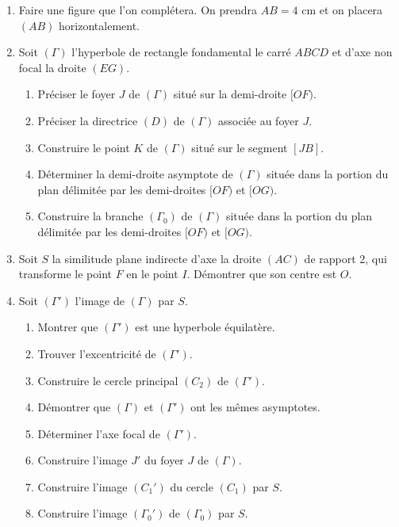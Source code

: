 \documentclass[11pt]{article}
\begin{document}
\begin{enumerate}
  \item Faire une figure que l'on complétera. On prendra $AB = 4$ cm et on placera $(AB)$ horizontalement.
  \item Soit $(\Gamma)$ l'hyperbole de rectangle fondamental le carré $ABCD$ et d'axe non focal la droite $(EG)$.
  \begin{enumerate}[label=\alph*.]
    \item Préciser le foyer $J$ de $(\Gamma)$ situé sur la demi-droite $[OF)$.
    \item Préciser la directrice $(D)$ de $(\Gamma)$ associée au foyer $J$.
    \item Construire le point $K$ de $(\Gamma)$ situé sur le segment $[JB]$.
    \item Déterminer la demi-droite asymptote de $(\Gamma)$ située dans la portion du plan délimitée par les demi-droites $[OF)$ et $[OG)$.
    \item Construire la branche $(\Gamma_0)$ de $(\Gamma)$ située dans la portion du plan délimitée par les demi-droites $[OF)$ et $[OG)$.
  \end{enumerate}
  \item Soit $S$ la similitude plane indirecte d'axe la droite $(AC)$ de rapport 2, qui transforme le point $F$ en le point $I$. Démontrer que son centre est $O$.
  \item Soit $(\Gamma')$ l'image de $(\Gamma)$ par $S$.
  \begin{enumerate}[label=\alph*.]
    \item Montrer que $(\Gamma')$ est une hyperbole équilatère.
    \item Trouver l'excentricité de $(\Gamma')$.
    \item Construire le cercle principal $(C_2)$ de $(\Gamma')$.
    \item Démontrer que $(\Gamma)$ et $(\Gamma')$ ont les mêmes asymptotes.
    \item Déterminer l'axe focal de $(\Gamma')$.
    \item Construire l'image $J'$ du foyer $J$ de $(\Gamma)$.
    \item Construire l'image $(C_1')$ du cercle $(C_1)$ par $S$.
    \item Construire l'image $(\Gamma_0')$ de $(\Gamma_0)$ par $S$.
  \end{enumerate}
\end{enumerate}

\end{document}
